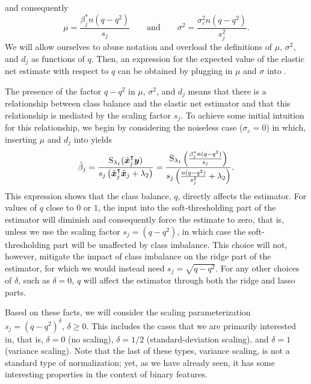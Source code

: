and consequently
\[
  \mu = \frac{\beta^*_j n(q - q^2)}{s_j}\qquad \text{and} \qquad \sigma^2 = \frac{\sigma_\varepsilon^2n(q - q^2)}{s^2_j}.
\]
We will allow ourselves to abuse notation and overload the definitions of \(\mu\), \(\sigma^2\), and \(d_j\) as functions of \(q\). Then, an expression for the expected value of the elastic net estimate with respect to \(q\) can be obtained by plugging in \(\mu\) and \(\sigma\) into .

The presence of the factor \(q - q^2\) in \(\mu\), \(\sigma^2\), and \(d_j\) means that there is a relationship between class balance and the elastic net estimator and that this relationship is mediated by the scaling factor \(s_j\). To achieve some initial intuition for this relationship, we begin by considering the noiseless case (\(\sigma_\varepsilon = 0\)) in which, inserting  \(\mu\) and \(d_j\) into  yields
\begin{equation}
  \label{eq:noiseless-estimator}
  \hat{\beta}_j = \frac{\operatorname{S}_{\lambda_1}(\tilde{\boldsymbol{x}}_j^\intercal \boldsymbol{y})}{s_j\left(\tilde{\boldsymbol{x}}_j^\intercal \tilde{\boldsymbol{x}}_j + \lambda_2\right)}
  =
  \frac{\operatorname{S}_{\lambda_1}\left(\frac{\beta_j^* n (q - q^2)}{s_j}\right)}{s_j\left(\frac{n(q - q^2)}{s_j^2} + \lambda_2\right)}.
\end{equation}
This expression shows that the class balance, \(q\), directly affects the estimator. For values of \(q\) close to \(0\) or \(1\), the input into the soft-thresholding part of the estimator will diminish and consequently force the estimate to zero, that is, unless we use the scaling factor \(s_j = (q - q^2)\), in which case the soft-thresholding part will be unaffected by class imbalance. This choice will not, however, mitigate the impact of class imbalance on the ridge part of the estimator, for which we would instead need \(s_j = \sqrt{q - q^2}\). For any other choices of \(\delta\), such as \(\delta = 0\), \(q\) will affect the estimator through both the ridge and lasso parts.

Based on these facts, we will consider the scaling parameterization \(s_j = (q-q^2)^\delta\), \(\delta \geq 0\). This includes the cases that we are primarily interested in, that is,
\(\delta = 0\) (no scaling), \(\delta = 1/2\) (standard-deviation scaling), and \(\delta = 1\) (variance scaling). Note that the last of these types, variance scaling, is not a standard type of normalization; yet, as we have already seen, it has some interesting properties
in the context of binary features.

